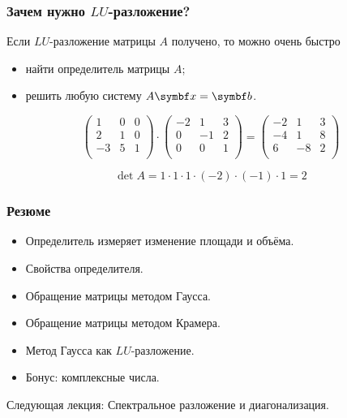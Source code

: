 \begin{frame}
    \frametitle{Зачем нужно $LU$-разложение?}

    Если $LU$-разложение матрицы $A$ получено, то можно очень быстро
    \begin{itemize}
        \item найти определитель матрицы $A$;
        \item решить любую систему $A\bx = \bb$.
    \end{itemize}

    \pause
    \[
    \begin{pmatrix}
        1 & 0 & 0 \\
        2 & 1 & 0 \\
        -3 & 5 & 1 \\
    \end{pmatrix} \cdot 
    \begin{pmatrix}
        -2 & 1 & 3 \\
        0 & -1 & 2 \\
        0 &  0 & 1 \\
    \end{pmatrix} = 
    \begin{pmatrix}
-2 & 1 & 3 \\
-4 & 1 & 8 \\
6 &  -8 & 2 \\        
    \end{pmatrix}
    \]

    \pause
    \[
    \det A = 1\cdot 1\cdot 1\cdot (-2) \cdot (-1) \cdot 1 = 2
    \]    

\end{frame}



\begin{frame}
    \frametitle{Резюме}

    \begin{itemize}[<+->]
    \item Определитель измеряет изменение площади и объёма.
    \item Свойства определителя.
    \item Обращение матрицы методом Гаусса.
    \item Обращение матрицы методом Крамера.
    \item Метод Гаусса как $LU$-разложение.
    \item Бонус: комплексные числа.
    \end{itemize}
    \pause
    \alert{Следующая лекция:} Спектральное разложение и диагонализация.
        


\end{frame}